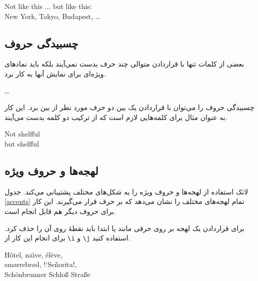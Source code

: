 \begin{lscommand}
\end{lscommand}



\begin{example}
Not like this ... but like this:\\
New York, Tokyo, Budapest, \ldots
\end{example}

\subsection{چسبیدگی حروف}
بعضی از کلمات تنها با قراردادن متوالی چند حرف بدست نمی‌آیند بلکه باید نمادهای ویژه‌ای برای نمایش آنها به کار برد.

\begin{code}
{\large {}\ldots}\quad
{}
\end{code}

چسبیدگی حروف را می‌توان با قراردادن یک 
بین دو حرف مورد نظر از بین برد. این کار به عنوان مثال برای کلمه‌هایی لازم است که از ترکیب دو کلمه بدست می‌آیند.

\begin{example}
\Large Not shelfful\\
but shelf\mbox{}ful
\end{example}

\subsection{لهجه‌ها و حروف ویژه}

لاتک استفاده از لهجه‌ها و حروف ویژه را به شکل‌های مختلف پشتیبانی می‌کند. جدول 
\ref{accents}
تمام لهجه‌های مختلف را نشان می‌دهد که بر حرف 
قرار می‌گیرند. این کار برای حروف دیگر هم قابل انجام است. 

برای قراردادن یک لهجه بر روی حرفی مانند 
 یا 
ابتدا باید نقطهٔ روی آن را حذف کرد. برای انجام این کار از 
\verb|\i| و \verb|\j|
استفاده کنید.

\begin{example}
H\^otel, na\"\i ve, \'el\`eve,\\ 
sm\o rrebr\o d, !`Se\~norita!,\\
Sch\"onbrunner Schlo\ss{} 
Stra\ss e
\end{example}

